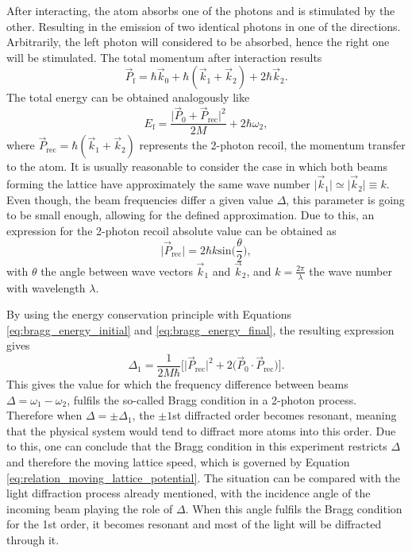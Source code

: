 After interacting, the atom absorbs one of the photons and is stimulated by the other. Resulting in the emission of two identical photons in one of the directions. Arbitrarily, the left photon will considered to be absorbed, hence the right one will be stimulated. The total momentum after interaction results
\begin{equation}
	\vec{P}_\text{f} = \hbar \vec{k}_0 + \hbar (\vec{k}_1 + \vec{k}_2) + 2\hbar\vec{k}_2.
\end{equation}
The total energy can be obtained analogously like 
 \begin{equation}\label{eq:bragg_energy_final}
 	E_\text{f} = \frac{\mathopen\big|\vec{P}_0+\vec{P}_\text{rec}\mathclose\big|^2}{2M} + 2\hbar\omega_2,
 \end{equation}
 where $\vec{P}_\text{rec} = \hbar (\vec{k}_1 + \vec{k}_2)$ represents the 2-photon recoil, the momentum transfer to the atom. It is usually reasonable to consider the case in which both beams forming the lattice have approximately the same wave number $\mathopen\big|\vec{k}_1\mathclose\big| \simeq \mathopen\big|\vec{k}_2\mathclose\big| \equiv k$. Even though, the beam frequencies differ a given value $\Delta$, this parameter is going to be small enough, allowing for the defined approximation. Due to this, an expression for the 2-photon recoil absolute value can be obtained as
\begin{equation}\label{eq:two_photon_recoil}
	\mathopen\big|\vec{P}_\text{rec}\mathclose\big| = 2 \hbar k \text{sin}\bigg(\frac{\theta}{2}\bigg),
\end{equation}
with $\theta$ the angle between wave vectors $\vec{k}_1$ and $\vec{k}_2$, and $k=\frac{2\pi}{\lambda}$ the wave number with wavelength $\lambda$.

By using the energy conservation principle with Equations \eqref{eq:bragg_energy_initial} and \eqref{eq:bragg_energy_final}, the resulting expression gives
\begin{equation}\label{eq:Bragg_condition_1}
	 \Delta_1 = \frac{1}{2M\hbar}\bigg[\mathopen\big|\vec{P}_{\text{rec}}\mathclose\big|^2 + 2\big(\vec{P}_0 \cdot \vec{P}_{\text{rec}}\big)\bigg].
\end{equation}
This gives the value for which the frequency difference between beams $\Delta = \omega_1-\omega_2$, fulfils the so-called Bragg condition in a 2-photon process. Therefore when $\Delta = \pm\Delta_1$, the $\pm1$st diffracted order becomes resonant, meaning that the physical system would tend to diffract more atoms into this order. Due to this, one can conclude that the Bragg condition in this experiment restricts $\Delta$ and therefore the moving lattice speed, which is governed by Equation \eqref{eq:relation_moving_lattice_potential}. The situation can be compared with the light diffraction process already mentioned, with the incidence angle of the incoming beam playing the role of $\Delta$. When this angle fulfils the Bragg condition for the 1st order, it becomes resonant and most of the light will be diffracted through it. 

